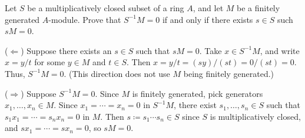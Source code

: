 \begin{exercise}
Let \(S\) be a multiplicatively closed subset of a ring \(A\), and let \(M\) be a finitely generated \(A\)-module.
Prove that \(S^{-1} M = 0\) if and only if there exists \(s \in S\) such \(s M = 0\).
\end{exercise}

\begin{solution}
(\(\Leftarrow\))
Suppose there exists an \(s \in S\) such that \(s M = 0\).
Take \(x \in S^{-1} M\), and write \(x = y / t\) for some \(y \in M\) and \(t \in S\).
Then \(x = y / t = (s y) / (s t) = 0 / (s t) = 0\).
Thus, \(S^{-1} M = 0\).
(This direction does not use \(M\) being finitely generated.)

(\(\Rightarrow\))
Suppose \(S^{-1} M = 0\).
Since \(M\) is finitely generated, pick generators \(x_1, \ldots, x_n \in M\).
Since \(x_1 = \cdots = x_n = 0\) in \(S^{-1} M\), there exist \(s_1, \ldots, s_n \in S\) such that \(s_1 x_1 = \cdots = s_n x_n = 0\) in \(M\).
Then \(s \coloneqq s_1 \cdots s_n \in S\) since \(S\) is multiplicatively closed, and \(s x_1 = \cdots = s x_n = 0\), so \(s M = 0\).
\end{solution}